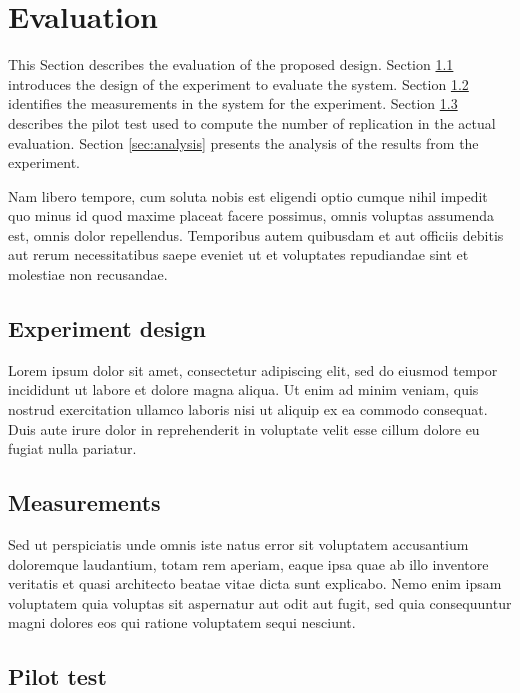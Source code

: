 \documentclass[conference]{IEEEtran}
\begin{document}
\section{Evaluation}
\label{sec:evaluation}

This Section describes the evaluation of the proposed design.
Section \ref{sec:design} introduces the design of the experiment to evaluate the system. 
Section \ref{sec:measurements} identifies the measurements in the system for the experiment.
Section \ref{sec:pilot_test} describes the pilot test used to compute the number of replication in the actual evaluation. 
Section \ref{sec:analysis} presents the analysis of the results from the experiment. 

Nam libero tempore, cum soluta nobis est eligendi optio cumque nihil impedit quo minus id quod maxime placeat facere possimus, omnis voluptas assumenda est, omnis dolor repellendus. Temporibus autem quibusdam et aut officiis debitis aut rerum necessitatibus saepe eveniet ut et voluptates repudiandae sint et molestiae non recusandae.

\subsection{Experiment design}
\label{sec:design}

Lorem ipsum dolor sit amet, consectetur adipiscing elit, sed do eiusmod tempor incididunt ut labore et dolore magna aliqua. Ut enim ad minim veniam, quis nostrud exercitation ullamco laboris nisi ut aliquip ex ea commodo consequat. Duis aute irure dolor in reprehenderit in voluptate velit esse cillum dolore eu fugiat nulla pariatur.

\subsection{Measurements}
\label{sec:measurements}

Sed ut perspiciatis unde omnis iste natus error sit voluptatem accusantium doloremque laudantium, totam rem aperiam, eaque ipsa quae ab illo inventore veritatis et quasi architecto beatae vitae dicta sunt explicabo. Nemo enim ipsam voluptatem quia voluptas sit aspernatur aut odit aut fugit, sed quia consequuntur magni dolores eos qui ratione voluptatem sequi nesciunt.

\subsection{Pilot test}
\label{sec:pilot_test}
\end{document}
